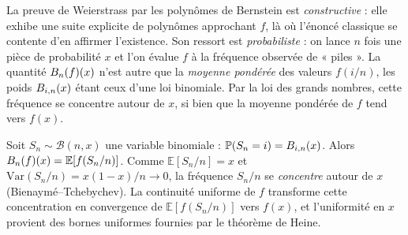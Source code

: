 \begin{significationintuitive}
La preuve de Weierstrass par les polynômes de Bernstein est
\emph{constructive} : elle exhibe une suite explicite de polynômes
approchant $f$, là où l'énoncé classique se contente d'en affirmer
l'existence. Son ressort est \emph{probabiliste} : on lance $n$ fois une
pièce de probabilité $x$ et l'on évalue $f$ à la fréquence observée de
« piles ». La quantité $B_n(f)(x)$ n'est autre que la \emph{moyenne pondérée}
des valeurs $f(i/n)$, les poids $B_{i,n}(x)$ étant ceux d'une loi binomiale.
Par la loi des grands nombres, cette fréquence se concentre autour de $x$,
si bien que la moyenne pondérée de $f$ tend vers $f(x)$.
\end{significationintuitive}

\decsep{}


\begin{ideepreuve}
Soit $S_n \sim \mathcal{B}(n,x)$ une variable binomiale : $\mathbb{P}(S_n=i)
= B_{i,n}(x)$. Alors $B_n(f)(x) = \mathbb{E}\!\left[f(S_n/n)\right]$. Comme
$\mathbb{E}[S_n/n]=x$ et $\mathrm{Var}(S_n/n)=x(1-x)/n \to 0$, la fréquence
$S_n/n$ se \emph{concentre} autour de $x$ (Bienaymé--Tchebychev). La
continuité uniforme de $f$ transforme cette concentration en convergence
de $\mathbb{E}[f(S_n/n)]$ vers $f(x)$, et l'uniformité en $x$ provient des
bornes uniformes fournies par le théorème de Heine.
\end{ideepreuve}

\vspace{10pt}

